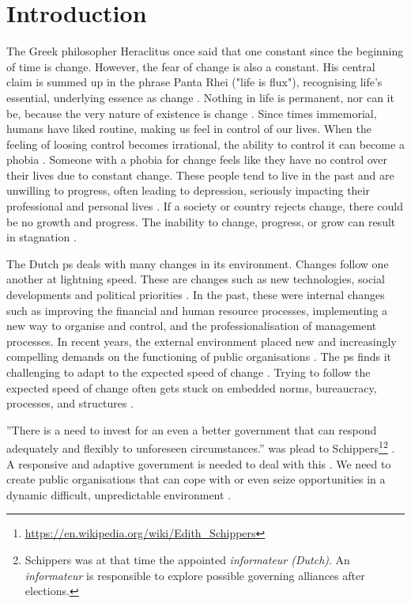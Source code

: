 \chapter{Introduction}
\label{ch:introduction}
\setcounter{footnote}{0}
The Greek philosopher Heraclitus once said that one constant since the beginning of time is change. However, the fear of change is also a constant. His central claim is summed up in the phrase Panta Rhei ("life is flux"), recognising life's essential, underlying essence as change \parencite{Seibt2022}. Nothing in life is permanent, nor can it be, because the very nature of existence is change \parencite{Seibt2022}. Since times \gls{immemorial}, humans have liked routine, making us feel in control of our lives. When the feeling of loosing control becomes irrational, the ability to control it can become a phobia \parencite{PsychTimes}. Someone with a phobia for change feels like they have no control over their lives due to constant change. These people tend to live in the past and are unwilling to progress, often leading to depression, seriously impacting their professional and personal lives \parencite{PsychTimes}. If a society or country rejects change, there could be no growth and progress. The inability to change, progress, or grow can result in stagnation \parencite{Mark2010}.

The Dutch \gls{ps} deals with many changes in its environment. Changes follow one another at lightning speed. These are changes such as new technologies, social developments and political priorities \parencite[p.~1]{Nijssen2018}. In the past, these were internal changes such as improving the financial and human resource processes, implementing a new way to organise and control, and the professionalisation of management processes. In recent years, the external environment placed new and increasingly compelling demands on the functioning of public organisations \parencite[p.~13]{Eck2009}. The \gls{ps} finds it challenging to adapt to the expected speed of change \parencites{Linders2013}[p.~2]{Wiebes2014}[pp.~5--6]{Auditdienst2019a}[p.~8]{Meijer2019}[pp.~1--2]{Tangi2020}. Trying to follow the expected speed of change often gets stuck on embedded norms, bureaucracy, processes, and structures \parencite[p.~1]{Tangi2020}. 

''There is a need to invest for an even a better government that can respond adequately and flexibly to unforeseen circumstances.'' was plead to Schippers\footnote{\url{https://en.wikipedia.org/wiki/Edith_Schippers}}\footnote{Schippers was at that time the appointed \textit{informateur (Dutch)}. An \textit{informateur} is responsible to explore possible governing alliances after elections.} \parencite{Secretarissen-generaal2018}. A responsive and adaptive government is needed to deal with this \parencite[pp.~79--81]{Steen2018}. We need to create public organisations that can cope with or even seize opportunities in a dynamic difficult, unpredictable environment \parencite[pp.~1--2]{Nijssen2018}. 

